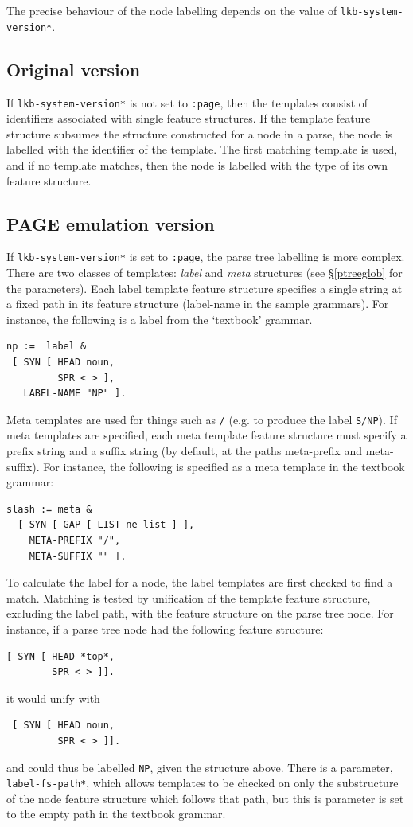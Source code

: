 \documentclass[12pt]{report}
\newcommand{\lkbparam}[1]{{\tt #1}}
\newcommand{\newterm}[1]{{\it #1}}
\begin{document}
The precise behaviour of the node labelling depends on
the value of \lkbparam{*lkb-system-version*}.  

\subsection{Original version}

If \lkbparam{*lkb-system-version*} is not set to 
{\tt :page}, then the templates consist of identifiers 
associated with single feature
structures.  If the template feature structure subsumes the structure
constructed for a node in a parse, the node is labelled with the identifier
of the template.
The first matching template is used, and if no template matches,
then the node is labelled with the type of its own feature structure.

\subsection{PAGE emulation version}
If \lkbparam{*lkb-system-version*} is set to 
{\tt :page}, the parse tree labelling is more complex.
There are two classes of templates: \newterm{label} and \newterm{meta}
structures (see \S\ref{ptreeglob} for the parameters).
Each label template feature structure specifies 
a single string at a fixed path in
its feature structure ({\feature label-name} in the sample grammars).
For instance, the following is a label from the `textbook' grammar.
\begin{verbatim}
np :=  label &
 [ SYN [ HEAD noun,
         SPR < > ],
   LABEL-NAME "NP" ].
\end{verbatim}
Meta templates are used for things such as {\tt /} (e.g. to produce
the label {\tt S/NP}).
If meta templates are specified,
each meta template feature structure must
specify a prefix string and a suffix string
(by default, at the paths {\feature meta-prefix} and {\feature meta-suffix}).  
For instance, the following is specified as a meta template in the textbook
grammar:
\begin{verbatim}
slash := meta &
  [ SYN [ GAP [ LIST ne-list ] ],
    META-PREFIX "/",
    META-SUFFIX "" ].
\end{verbatim}

To calculate the label for a 
node, the label templates are first checked to find a match.
Matching is tested by unification of the template feature
structure, excluding the label path, with the feature structure
on the parse tree node.
For instance, if a parse tree node had the following feature structure:
\begin{verbatim}
[ SYN [ HEAD *top*,
        SPR < > ]].
\end{verbatim}
it would unify with
\begin{verbatim}
 [ SYN [ HEAD noun,
         SPR < > ]].
\end{verbatim}
and could thus be labelled {\tt NP}, given the structure above.
There is a parameter, \lkbparam{*label-fs-path*}, which allows
templates to be checked on only the substructure of the node
feature structure which follows that path, but
this is parameter is set to the empty path in the textbook grammar. 
\end{document}
